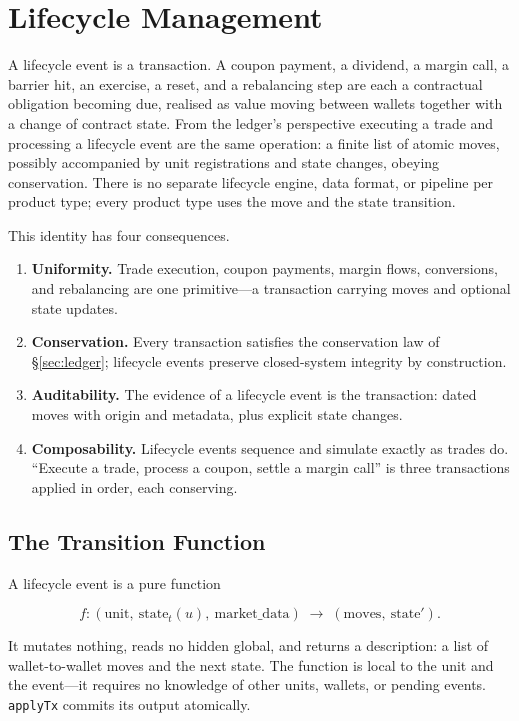 \section{Lifecycle Management}
\label{sec:sec07}
\label{sec:lifecycle}

A lifecycle event is a transaction. A coupon payment, a dividend, a margin call, a barrier hit, an exercise, a reset, and a rebalancing step are each a contractual obligation becoming due, realised as value moving between wallets together with a change of contract state. From the ledger's perspective executing a trade and processing a lifecycle event are the same operation: a finite list of atomic moves, possibly accompanied by unit registrations and state changes, obeying conservation. There is no separate lifecycle engine, data format, or pipeline per product type; every product type uses the move and the state transition.

This identity has four consequences.

\begin{enumerate}[nosep]
\item \textbf{Uniformity.} Trade execution, coupon payments, margin flows, conversions, and rebalancing are one primitive---a transaction carrying moves and optional state updates.
\item \textbf{Conservation.} Every transaction satisfies the conservation law of \S\ref{sec:ledger}; lifecycle events preserve closed-system integrity by construction.
\item \textbf{Auditability.} The evidence of a lifecycle event is the transaction: dated moves with origin and metadata, plus explicit state changes.
\item \textbf{Composability.} Lifecycle events sequence and simulate exactly as trades do. ``Execute a trade, process a coupon, settle a margin call'' is three transactions applied in order, each conserving.
\end{enumerate}

\subsection{The Transition Function}

A lifecycle event is a pure function

\[
f : (\text{unit},\ \text{state}_t(u),\ \text{market\_data}) \;\to\; (\text{moves},\ \text{state}').
\]

It mutates nothing, reads no hidden global, and returns a description: a list of wallet-to-wallet moves and the next state. The function is local to the unit and the event---it requires no knowledge of other units, wallets, or pending events. \texttt{applyTx} commits its output atomically.

